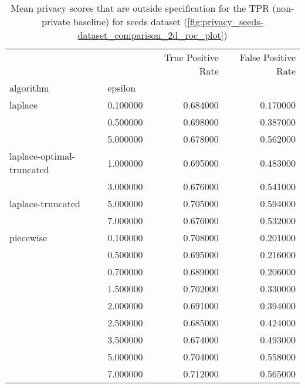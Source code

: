 \begin{table}[H]
    \begin{tabularx}{.8\textwidth}{llrr}
        \toprule
                                  &          & True Positive Rate & False Positive Rate \\
        algorithm                 & epsilon  &                    &                     \\
        \midrule
        laplace                   & 0.100000 & 0.684000           & 0.170000            \\
                                  & 0.500000 & 0.698000           & 0.387000            \\
                                  & 5.000000 & 0.678000           & 0.562000            \\
        \cline{1-4}
        laplace-optimal-truncated & 1.000000 & 0.695000           & 0.483000            \\
                                  & 3.000000 & 0.676000           & 0.541000            \\
        \cline{1-4}
        laplace-truncated         & 5.000000 & 0.705000           & 0.594000            \\
                                  & 7.000000 & 0.676000           & 0.532000            \\
        \cline{1-4}
        piecewise                 & 0.100000 & 0.708000           & 0.201000            \\
                                  & 0.500000 & 0.695000           & 0.216000            \\
                                  & 0.700000 & 0.689000           & 0.206000            \\
                                  & 1.500000 & 0.702000           & 0.330000            \\
                                  & 2.000000 & 0.691000           & 0.394000            \\
                                  & 2.500000 & 0.685000           & 0.424000            \\
                                  & 3.500000 & 0.674000           & 0.493000            \\
                                  & 5.000000 & 0.704000           & 0.558000            \\
                                  & 7.000000 & 0.712000           & 0.565000            \\
        \cline{1-4}
        \bottomrule
    \end{tabularx}
    \caption{Mean privacy scores that are outside specification for the TPR (non-private baseline) for seeds dataset (\ref{fig:privacy_seeds-dataset_comparison_2d_roc_plot})}

\end{table}